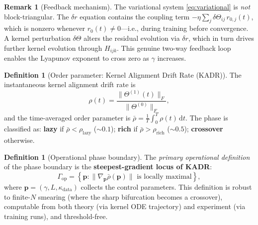 \documentclass[11pt]{article}
\theoremstyle{definition}
\newtheorem{definition}[theorem]{Definition}
\newtheorem{remark}[theorem]{Remark}
\newcommand{\norm}[1]{\lVert #1 \rVert}
\newcommand{\dd}{\mathrm{d}}
\renewcommand{\Theta}{\varTheta}
\begin{document}
\begin{remark}[Feedback mechanism]
The variational system \eqref{eq:variational} is \emph{not} block-triangular. The $\delta r$ equation contains the coupling term $-\eta \sum_j \delta\Theta_{ij}\, r_{0,j}(t)$, which is nonzero whenever $r_0(t) \neq 0$---i.e., during training before convergence. A kernel perturbation $\delta\Theta$ alters the residual evolution via $\delta r$, which in turn drives further kernel evolution through $H_{ijk}$. This genuine two-way feedback loop enables the Lyapunov exponent to cross zero as $\gamma$ increases.
\end{remark}

\begin{definition}[Order parameter: Kernel Alignment Drift Rate (KADR)]
\label{def:KADR}
The instantaneous kernel alignment drift rate is
\begin{equation}
\rho(t) = \frac{\norm{\Theta^{(1)}(t)}_F}{\norm{\Theta^{(0)}}_F},
\end{equation}
and the time-averaged order parameter is $\bar{\rho} = \frac{1}{T}\int_0^T \rho(t)\,\dd t$. The phase is classified as: \textbf{lazy} if $\bar{\rho} < \rho_{\mathrm{lazy}}$ ($\sim 0.1$); \textbf{rich} if $\bar{\rho} > \rho_{\mathrm{rich}}$ ($\sim 0.5$); \textbf{crossover} otherwise.
\end{definition}

\begin{definition}[Operational phase boundary]
\label{def:operational-boundary}
The \emph{primary operational definition} of the phase boundary is the \textbf{steepest-gradient locus of KADR}:
\begin{equation}
\Gamma_{\mathrm{op}} = \left\{\mathbf{p} : \norm{\nabla_{\mathbf{p}} \bar{\rho}(\mathbf{p})} \text{ is locally maximal}\right\},
\end{equation}
where $\mathbf{p} = (\gamma, L, \kappa_{\mathrm{data}})$ collects the control parameters. This definition is robust to finite-$N$ smearing (where the sharp bifurcation becomes a crossover), computable from both theory (via kernel ODE trajectory) and experiment (via training runs), and threshold-free.
\end{definition}
\end{document}
